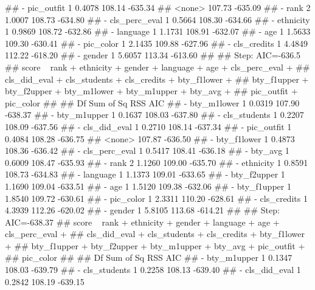 \documentclass[]{article}
\newenvironment{Shaded}{\begin{snugshade}}{\end{snugshade}}
\newcommand{\NormalTok}[1]{#1}
\begin{document}
\begin{Shaded}
\begin{Highlighting}[]
\NormalTok{## - pic_outfit     1    0.4078 108.14 -635.34}
\NormalTok{## <none>                       107.73 -635.09}
\NormalTok{## - rank           2    1.0007 108.73 -634.80}
\NormalTok{## - cls_perc_eval  1    0.5664 108.30 -634.66}
\NormalTok{## - ethnicity      1    0.9869 108.72 -632.86}
\NormalTok{## - language       1    1.1731 108.91 -632.07}
\NormalTok{## - age            1    1.5633 109.30 -630.41}
\NormalTok{## - pic_color      1    2.1435 109.88 -627.96}
\NormalTok{## - cls_credits    1    4.4849 112.22 -618.20}
\NormalTok{## - gender         1    5.6057 113.34 -613.60}
\NormalTok{## }
\NormalTok{## Step:  AIC=-636.5}
\NormalTok{## score ~ rank + ethnicity + gender + language + age + cls_perc_eval + }
\NormalTok{##     cls_did_eval + cls_students + cls_credits + bty_f1lower + }
\NormalTok{##     bty_f1upper + bty_f2upper + bty_m1lower + bty_m1upper + bty_avg + }
\NormalTok{##     pic_outfit + pic_color}
\NormalTok{## }
\NormalTok{##                 Df Sum of Sq    RSS     AIC}
\NormalTok{## - bty_m1lower    1    0.0319 107.90 -638.37}
\NormalTok{## - bty_m1upper    1    0.1637 108.03 -637.80}
\NormalTok{## - cls_students   1    0.2207 108.09 -637.56}
\NormalTok{## - cls_did_eval   1    0.2710 108.14 -637.34}
\NormalTok{## - pic_outfit     1    0.4084 108.28 -636.75}
\NormalTok{## <none>                       107.87 -636.50}
\NormalTok{## - bty_f1lower    1    0.4873 108.36 -636.42}
\NormalTok{## - cls_perc_eval  1    0.5417 108.41 -636.18}
\NormalTok{## - bty_avg        1    0.6009 108.47 -635.93}
\NormalTok{## - rank           2    1.1260 109.00 -635.70}
\NormalTok{## - ethnicity      1    0.8591 108.73 -634.83}
\NormalTok{## - language       1    1.1373 109.01 -633.65}
\NormalTok{## - bty_f2upper    1    1.1690 109.04 -633.51}
\NormalTok{## - age            1    1.5120 109.38 -632.06}
\NormalTok{## - bty_f1upper    1    1.8540 109.72 -630.61}
\NormalTok{## - pic_color      1    2.3311 110.20 -628.61}
\NormalTok{## - cls_credits    1    4.3939 112.26 -620.02}
\NormalTok{## - gender         1    5.8105 113.68 -614.21}
\NormalTok{## }
\NormalTok{## Step:  AIC=-638.37}
\NormalTok{## score ~ rank + ethnicity + gender + language + age + cls_perc_eval + }
\NormalTok{##     cls_did_eval + cls_students + cls_credits + bty_f1lower + }
\NormalTok{##     bty_f1upper + bty_f2upper + bty_m1upper + bty_avg + pic_outfit + }
\NormalTok{##     pic_color}
\NormalTok{## }
\NormalTok{##                 Df Sum of Sq    RSS     AIC}
\NormalTok{## - bty_m1upper    1    0.1347 108.03 -639.79}
\NormalTok{## - cls_students   1    0.2258 108.13 -639.40}
\NormalTok{## - cls_did_eval   1    0.2842 108.19 -639.15}

\end{Highlighting}
\end{Shaded}
\end{document}

